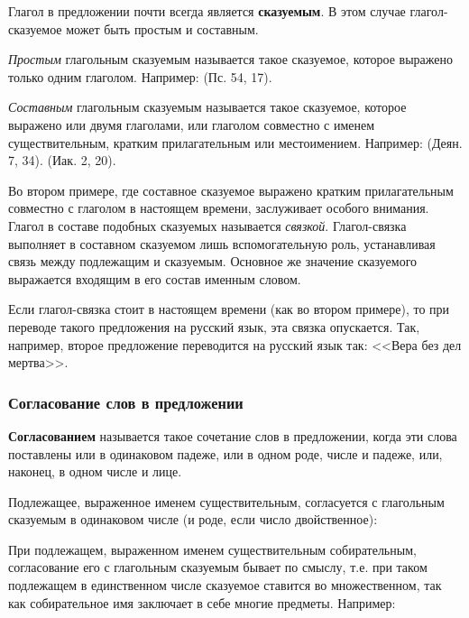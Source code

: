 \documentclass[11pt,a4paper,oneside]{memoir}
\begin{document}
    Глагол в предложении почти всегда является \textbf{сказуемым}. В этом случае глагол-сказуемое может быть простым и составным.
    
    \emph{Простым} глагольным сказуемым называется такое сказуемое, которое выражено только одним глаголом. Например: {} (Пс. 54, 17).
    
    \emph{Составным} глагольным сказуемым называется такое сказуемое, которое выражено или двумя глаголами, или глаголом совместно с именем существительным, кратким прилагательным или местоимением. Например: {} (Деян. 7, 34). {} (Иак. 2, 20).
    
    Во втором примере, где составное сказуемое выражено кратким прилагательным совместно с глаголом {} в настоящем времени, заслуживает особого внимания. Глагол {} в составе подобных сказуемых называется \emph{связкой}. Глагол-связка выполняет в составном сказуемом лишь вспомогательную роль, устанавливая связь между подлежащим и сказуемым. Основное же значение сказуемого выражается входящим в его состав именным словом.
    
    Если глагол-связка стоит в настоящем времени (как во втором примере), то при переводе такого предложения на русский язык, эта связка опускается. Так, например, второе предложение переводится на русский язык так: <<Вера без дел мертва>>.

                \subsubsection{Согласование слов в предложении}

    \textbf{Согласованием} называется такое сочетание слов в предложении, когда эти слова поставлены или в одинаковом падеже, или в одном роде, числе и падеже, или, наконец, в одном числе и лице.
    
    Подлежащее, выраженное именем существительным, согласуется с глагольным сказуемым в одинаковом числе (и роде, если число двойственное):
    
    \bigskip{}

    При подлежащем, выраженном именем существительным собирательным, согласование его с глагольным сказуемым бывает по смыслу, т.е. при таком подлежащем в единственном числе сказуемое ставится во множественном, так как собирательное имя заключает в себе многие предметы. Например:
    
\end{document}
